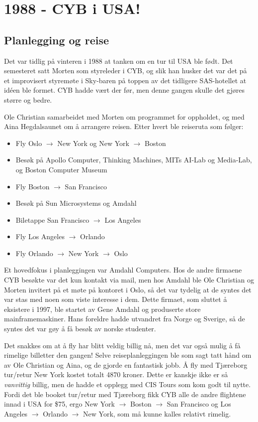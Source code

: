 \chapter{1988 - CYB i USA!}

\author{Av Morten Moen \& Ole Christian Lingjærde}

\section{Planlegging og reise}

Det var tidlig på vinteren i 1988 at tanken om en tur til USA ble født. Det semesteret satt Morten som styreleder i CYB, og slik han husker det var det på et improvisert styremøte i Sky-baren på toppen av det tidligere SAS-hotellet at idéen ble formet. CYB hadde vært der før, men denne gangen skulle det gjøres større og bedre.

Ole Christian samarbeidet med Morten om programmet for oppholdet, og med Aina Hegdalsaunet om å arrangere reisen. Etter hvert ble reiseruta som følger:

\begin{itemize}
	\item Fly Oslo $\to$ New York og New York $\to$ Boston
	\item Besøk på Apollo Computer, Thinking Machines, MITs AI-Lab og Media-Lab, og Boston Computer Museum
	\item Fly Boston $\to$ San Francisco 
	\item Besøk på Sun Microsystems og Amdahl
	\item Biletappe San Francisco $\to$ Los Angeles
	\item Fly Los Angeles $\to$ Orlando
	\item Fly Orlando $\to$ New York $\to$ Oslo
\end{itemize}

Et hovedfokus i planleggingen var Amdahl Computers. Hos de andre firmaene CYB besøkte var det kun kontakt via mail, men hos Amdahl ble Ole Christian og Morten invitert på et møte på kontoret i Oslo, så det var tydelig at de syntes det var stas med noen som viste interesse i dem. Dette firmaet, som sluttet å eksistere i 1997, ble startet av Gene Amdahl og produserte store mainframemaskiner. Hans foreldre hadde utvandret fra Norge og Sverige, så de syntes det var gøy å få besøk av norske studenter.

Det snakkes om at å fly har blitt veldig billig nå, men det var også mulig å få rimelige billetter den gangen! Selve reiseplanleggingen ble som sagt tatt hånd om av Ole Christian og Aina, og de gjorde en fantastisk jobb. Å fly med Tjæreborg tur/retur New York kostet totalt 4870 kroner. Dette er kanskje ikke er så \textit{vanvittig} billig, men de hadde et opplegg med CIS Tours som kom godt til nytte. Fordi det ble booket tur/retur med Tjæreborg fikk CYB alle de andre flightene innad i USA for \$75, ergo New York $\to$ Boston $\to$ San Francisco og Los Angeles $\to$ Orlando $\to$ New York, som må kunne kalles relativt rimelig. 


